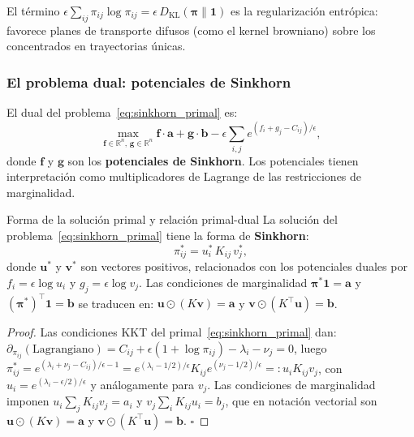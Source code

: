 El término $\epsilon\sum_{ij}\pi_{ij}\log\pi_{ij} = \epsilon\,D_{\mathrm{KL}}(\bm{\pi}\|\bm{1})$
es la regularización entrópica: favorece planes de transporte difusos
(como el kernel browniano) sobre los concentrados en trayectorias únicas.

\subsubsection*{El problema dual: potenciales de Sinkhorn}

El dual del problema~\eqref{eq:sinkhorn_primal} es:
\begin{equation}
  \max_{\bm{f}\in\mathbb{R}^n,\,\bm{g}\in\mathbb{R}^n}
  \bm{f}\cdot\bm{a} + \bm{g}\cdot\bm{b}
  - \epsilon\sum_{i,j}e^{(f_i+g_j-C_{ij})/\epsilon},
  \label{eq:sinkhorn_dual}
\end{equation}
donde $\bm{f}$ y $\bm{g}$ son los \textbf{potenciales de Sinkhorn}.
Los potenciales tienen interpretación como multiplicadores de Lagrange de las
restricciones de marginalidad.

\begin{proposicion}{Forma de la solución primal y relación primal-dual}
\label{prop:sinkhorn_solucion}
La solución del problema~\eqref{eq:sinkhorn_primal} tiene la forma de
\textbf{Sinkhorn}:
\begin{equation}
  \pi_{ij}^* = u_i^*\,K_{ij}\,v_j^*,
  \label{eq:sinkhorn_forma}
\end{equation}
donde $\bm{u}^*$ y $\bm{v}^*$ son vectores positivos, relacionados con los
potenciales duales por $f_i = \epsilon\log u_i$ y $g_j = \epsilon\log v_j$.
Las condiciones de marginalidad $\bm{\pi}^*\bm{1} = \bm{a}$ y
$(\bm{\pi}^*)^\top\bm{1} = \bm{b}$ se traducen en:
$\bm{u}\odot(K\bm{v}) = \bm{a}$ y $\bm{v}\odot(K^\top\bm{u}) = \bm{b}$.
\end{proposicion}

\begin{proof}
Las condiciones KKT del primal~\eqref{eq:sinkhorn_primal} dan:
$\partial_{\pi_{ij}}(\text{Lagrangiano}) = C_{ij} + \epsilon(1+\log\pi_{ij})
- \lambda_i - \nu_j = 0$,
luego $\pi_{ij}^* = e^{(\lambda_i+\nu_j-C_{ij})/\epsilon - 1}
= e^{(\lambda_i-1/2)/\epsilon}K_{ij}e^{(\nu_j-1/2)/\epsilon}
=: u_i K_{ij} v_j$, con $u_i = e^{(\lambda_i-\epsilon/2)/\epsilon}$ y
análogamente para $v_j$. Las condiciones de marginalidad imponen
$u_i\sum_j K_{ij}v_j = a_i$ y $v_j\sum_i K_{ij}u_i = b_j$, que en notación
vectorial son $\bm{u}\odot(K\bm{v}) = \bm{a}$ y $\bm{v}\odot(K^\top\bm{u}) = \bm{b}$.
$\square$
\end{proof}

